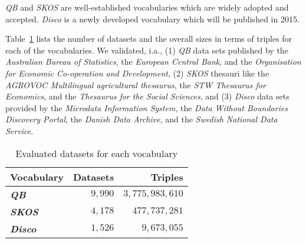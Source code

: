 \documentclass{llncs}
\newcommand{\ke}[1]{\todo[size=\small, color=red!40]{\textbf{Kai:} #1}}
\begin{document}
\emph{QB} and \emph{SKOS} are well-established vocabularies which are widely adopted and accepted. \emph{Disco} is a newly developed vocabulary which will be published in 2015.



Table~\ref{tab:datasets} lists the number of datasets and the overall sizes in terms of triples for each of the vocabularies. We validated, i.a., 
(1) \emph{QB} data sets published by the \emph{Australian Bureau of Statistics},
the \emph{European Central Bank}, and the
\emph{Organisation for Economic Co-operation and Development},
(2) \emph{SKOS} thesauri like the \emph{AGROVOC Multilingual agricultural thesaurus},
the \emph{STW Thesaurus for Economics}, and the
\emph{Thesaurus for the Social Sciences}, and
(3) \emph{Disco} data sets provided by the \emph{Microdata Information System}, 
the \emph{Data Without Boundaries Discovery Portal}, the
\emph{Danish Data Archive}, and the
\emph{Swedish National Data Service}.


\begin{table}[H]
		\scriptsize
    \begin{center}
    \begin{tabular}{lrr}
           \textbf{Vocabulary}
           & \textbf{Datasets}
           & \textbf{Triples}
					 
    \\ \midrule
		\textbf{\emph{QB}} & $9,990$   & $3,775,983,610$  \\
		\textbf{\emph{SKOS}} & $4,178$  & $477,737,281$ \\
		\textbf{\emph{Disco}} & $1,526$  & $9,673,055$  \\
    \bottomrule
    \end{tabular}
    \caption{Evaluated datasets for each vocabulary}
		\label{tab:datasets}
    \end{center}
\end{table}
\end{document}
